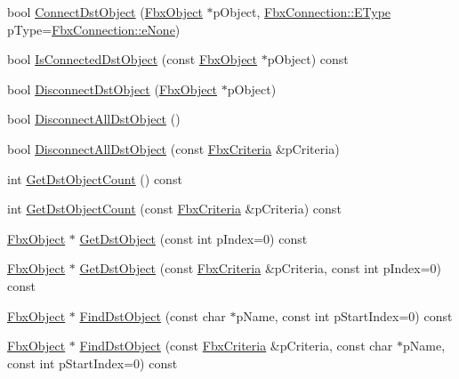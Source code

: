 \begin{DoxyCompactItemize}
bool \hyperlink{class_fbx_property_aa6ba6b487c09e1cecc2eb02440998d1a}{Connect\+Dst\+Object} (\hyperlink{class_fbx_object}{Fbx\+Object} $\ast$p\+Object, \hyperlink{class_fbx_connection_a3df448a5db356652ab99fd2be2553749}{Fbx\+Connection\+::\+E\+Type} p\+Type=\hyperlink{class_fbx_connection_a3df448a5db356652ab99fd2be2553749a47aa04870c3c0769263e3972e67e9ebe}{Fbx\+Connection\+::e\+None})
\item 
bool \hyperlink{class_fbx_property_a991b94a016bed8e93015e1024596bbef}{Is\+Connected\+Dst\+Object} (const \hyperlink{class_fbx_object}{Fbx\+Object} $\ast$p\+Object) const
\item 
bool \hyperlink{class_fbx_property_a322bdde93bd6716cdeeddd29d735d900}{Disconnect\+Dst\+Object} (\hyperlink{class_fbx_object}{Fbx\+Object} $\ast$p\+Object)
\item 
bool \hyperlink{class_fbx_property_ad4205b37ed636ff110565351d82a6468}{Disconnect\+All\+Dst\+Object} ()
\item 
bool \hyperlink{class_fbx_property_aab638ced78a12c068238b538159cf003}{Disconnect\+All\+Dst\+Object} (const \hyperlink{class_fbx_criteria}{Fbx\+Criteria} \&p\+Criteria)
\item 
int \hyperlink{class_fbx_property_a8a87e8b905f4a30eac5d382fa6b95dbc}{Get\+Dst\+Object\+Count} () const
\item 
int \hyperlink{class_fbx_property_acfca6ad7f8a1eebfecc838e91b7af100}{Get\+Dst\+Object\+Count} (const \hyperlink{class_fbx_criteria}{Fbx\+Criteria} \&p\+Criteria) const
\item 
\hyperlink{class_fbx_object}{Fbx\+Object} $\ast$ \hyperlink{class_fbx_property_ace9e846d1442c106958d34a1364533e4}{Get\+Dst\+Object} (const int p\+Index=0) const
\item 
\hyperlink{class_fbx_object}{Fbx\+Object} $\ast$ \hyperlink{class_fbx_property_a49669c464e5caecb2cf954972e9af366}{Get\+Dst\+Object} (const \hyperlink{class_fbx_criteria}{Fbx\+Criteria} \&p\+Criteria, const int p\+Index=0) const
\item 
\hyperlink{class_fbx_object}{Fbx\+Object} $\ast$ \hyperlink{class_fbx_property_a5c816ef8651dedd41022121ed073eeaa}{Find\+Dst\+Object} (const char $\ast$p\+Name, const int p\+Start\+Index=0) const
\item 
\hyperlink{class_fbx_object}{Fbx\+Object} $\ast$ \hyperlink{class_fbx_property_a7cdf86294b2b1dc3ec1e98bbb3bf2c87}{Find\+Dst\+Object} (const \hyperlink{class_fbx_criteria}{Fbx\+Criteria} \&p\+Criteria, const char $\ast$p\+Name, const int p\+Start\+Index=0) const
\item 

\end{DoxyCompactItemize}
